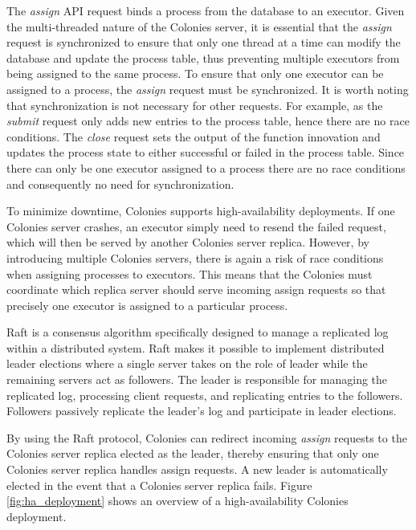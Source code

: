 \documentclass{article}
\begin{document}
The \emph{assign} API request binds a process from the database to an executor. Given the multi-threaded nature of the Colonies server, it is essential that the \emph{assign} request is synchronized to ensure that only one thread at a time can modify the database and update the process table, thus preventing multiple executors from being assigned to the same process. To ensure that only one executor can be assigned to a process, the \emph{assign} request must be synchronized. It is worth noting that synchronization is not necessary for other requests. For example, as the \emph{submit} request only adds new entries to the process table, hence there are no race conditions. The \emph{close} request sets the output of the function innovation and updates the process state to either successful or failed in the process table. Since there can only be one executor assigned to a process there are no race conditions and consequently no need for synchronization.

To minimize downtime, Colonies supports high-availability deployments. If one Colonies server crashes, an executor simply need to resend the failed request, which will then be served by another Colonies server replica. However, by introducing multiple Colonies servers, there is again a risk of race conditions when assigning processes to executors. This means that the Colonies must coordinate which replica server should serve incoming assign requests so that precisely one executor is assigned to a particular process.

Raft \cite{raft} is a consensus algorithm specifically designed to manage a replicated log within a distributed system. Raft makes it possible to implement distributed leader elections where a single server takes on the role of leader while the remaining servers act as followers. The leader is responsible for managing the replicated log, processing client requests, and replicating entries to the followers. Followers passively replicate the leader's log and participate in leader elections. 

By using the Raft protocol, Colonies can redirect incoming \emph{assign} requests to the Colonies server replica elected as the leader, thereby ensuring that only one Colonies server replica handles assign requests. A new leader is automatically elected in the event that a Colonies server replica fails. Figure \ref{fig:ha_deployment} shows an overview of a high-availability Colonies deployment. 
\end{document}
